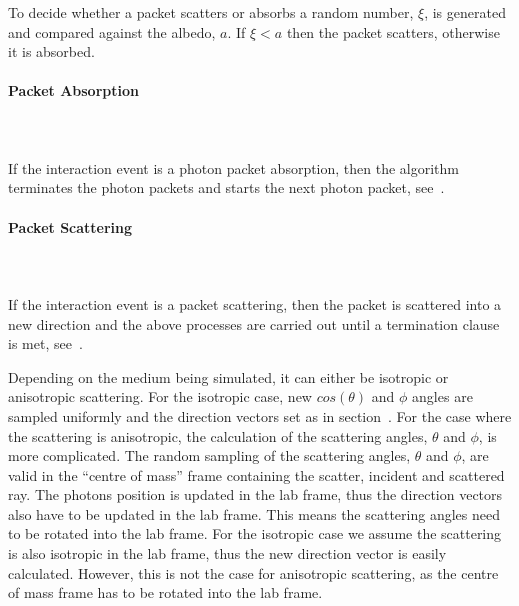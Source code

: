 To decide whether a packet scatters or absorbs a random number, $\xi$, is generated and compared against the albedo, $a$. 
If $\xi < a$ then the packet scatters, otherwise it is absorbed. 

\paragraph{Packet Absorption}\hspace{0pt}\\
\\
If the interaction event is a photon packet absorption, then the algorithm terminates the photon packets and starts the next photon packet, see~.

\paragraph{Packet Scattering}\hspace{0pt}\\
\\
If the interaction event is a packet scattering, then the packet is scattered into a new direction and the above processes are carried out until a termination clause is met, see~.

Depending on the medium being simulated, it can either be isotropic or anisotropic scattering. 
For the isotropic case, new $cos\left(\theta\right)$ and $\phi$ angles are sampled uniformly and the direction vectors set as in section~.
For the case where the scattering is anisotropic, the calculation of the scattering angles, $\theta$ and $\phi$, is more complicated.
The random sampling of the scattering angles, $\theta$ and $\phi$, are valid in the ``centre of mass'' frame containing the scatter, incident and scattered ray.
The photons position is updated in the lab frame, thus the direction vectors also have to be updated in the lab frame.
This means the scattering angles need to be rotated into the lab frame.
For the isotropic case we assume the scattering is also isotropic in the lab frame, thus the new direction vector is easily calculated.
However, this is not the case for anisotropic scattering, as the centre of mass frame has to be rotated into the lab frame.

\medskip

